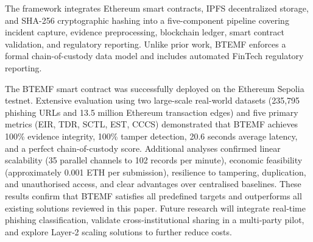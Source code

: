 \documentclass[conference]{IEEEtran}
\begin{document}
The framework integrates Ethereum smart contracts, IPFS decentralized storage, and SHA-256 cryptographic hashing into a five-component pipeline covering incident capture, evidence preprocessing, blockchain ledger, smart contract validation, and regulatory reporting. Unlike prior work, BTEMF enforces a formal chain-of-custody data model and includes automated FinTech regulatory reporting.
 
The BTEMF smart contract was successfully deployed on the Ethereum Sepolia testnet. Extensive evaluation using two large-scale real-world datasets (235,795 phishing URLs and 13.5 million Ethereum transaction edges) and five primary metrics (EIR, TDR, SCTL, EST, CCCS) demonstrated that BTEMF achieves 100\% evidence integrity, 100\% tamper detection, 20.6 seconds average latency, and a perfect chain-of-custody score. Additional analyses confirmed linear scalability (35 parallel channels to 102 records per minute), economic feasibility (approximately 0.001 ETH per submission), resilience to tampering, duplication, and unauthorised access, and clear advantages over centralised baselines. These results confirm that BTEMF satisfies all predefined targets and outperforms all existing solutions reviewed in this paper. Future research will integrate real‑time phishing classification, validate cross‑institutional sharing in a multi‑party pilot, and explore Layer‑2 scaling solutions to further reduce costs.

\begin{table}[!t]
\centering
\caption{Comparison – Proposed BTEMF vs. Previous Models}
\label{tab:evaluation_matrix}
\end{table}
\end{document}
